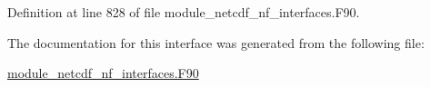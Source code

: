 Definition at line 828 of file module\+\_\+netcdf\+\_\+nf\+\_\+interfaces.\+F90.



The documentation for this interface was generated from the following file\+:\begin{DoxyCompactItemize}
\item 
\hyperlink{module__netcdf__nf__interfaces_8F90}{module\+\_\+netcdf\+\_\+nf\+\_\+interfaces.\+F90}\end{DoxyCompactItemize}
